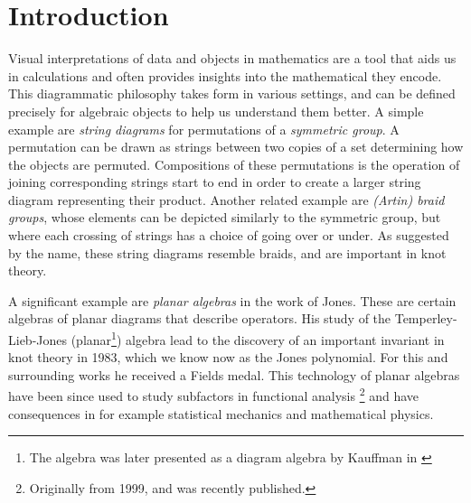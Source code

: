 \chapter{Introduction}

Visual interpretations of data and objects in mathematics are a tool that aids us in calculations and often provides insights into the mathematical they encode. This diagrammatic philosophy takes form in various settings, and can be defined precisely for algebraic objects to help us understand them better. A simple example are \textit{string diagrams} for permutations of a \textit{symmetric group}. A permutation can be drawn as strings between two copies of a set determining how the objects are permuted. Compositions of these permutations is the operation of joining corresponding strings start to end in order to create a larger string diagram representing their product. Another related example are \textit{(Artin) braid groups}, whose elements can be depicted similarly to the symmetric group, but where each crossing of strings has a choice of going over or under. As suggested by the name, these string diagrams resemble braids, and are important in knot theory.

A significant example are \textit{planar algebras} in the work of Jones. These are certain algebras of planar diagrams that describe operators. His study of the Temperley-Lieb-Jones (planar\footnote{The algebra was later presented as a diagram algebra by Kauffman in \cite{kauffman-tl-planar-algebra}}) algebra lead to the discovery of an important invariant in knot theory \cite{jones-knot-polynomial} in 1983, which we know now as the Jones polynomial. For this and surrounding works he received a Fields medal. This technology of planar algebras have been since used to study subfactors in functional analysis \cite{jones-planar-algebra}\footnote{Originally from 1999, and was recently published.} and have consequences in for example statistical mechanics and mathematical physics.

